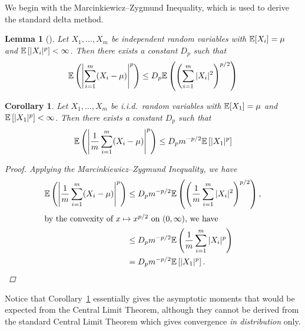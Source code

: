 \documentclass[a4paper, 10pt]{report}
\theoremstyle{plain}
\newtheorem{lemma}[theorem]{Lemma}
\newtheorem{corollary}[theorem]{Corollary}
\begin{document}
	
	We begin with the Marcinkiewicz--Zygmund Inequality, which is used to derive the standard delta method.
	\begin{lemma}[\citet{marcinkiewicz1937quelques}]
		Let $X_1,\dots,X_m$ be independent random variables with $\mathbb{E}[X_i]=\mu$ and $\mathbb{E}\left[|X_i|^p\right]<\infty$. 
		Then there exists a constant $D_p$ such that
		\begin{equation}
		\mathbb{E}\left( \left|\sum_{i=1}^m (X_i - \mu) \right|^p \right) \le D_p \mathbb{E}\left( \left( \sum_{i=1}^m |X_i|^2 \right)^{p/2} \right)
		\end{equation}
	\end{lemma}
	\begin{corollary}
		\label{cor:moment}
		Let $X_1,\dots,X_m$ be i.i.d.~random variables with $\mathbb{E}[X_1]=\mu$ and $\mathbb{E}\left[|X_1|^p\right]<\infty$. 
		Then there exists a constant $D_p$ such that
		\begin{equation}
		\mathbb{E}\left( \left| \frac{1}{m} \sum_{i=1}^m (X_i - \mu) \right|^p \right) \le D_p m^{-p/2} \mathbb{E}\left[|X_1|^p  \right]
		\end{equation}
		\begin{proof}
			Applying the Marcinkiewicz--Zygmund Inequality, we have
			\begin{align}
			\mathbb{E}\left( \left| \frac{1}{m} \sum_{i=1}^m (X_i - \mu) \right|^p \right) & \le D_p m^{-p/2} \mathbb{E}\left( \left( \frac{1}{m} \sum_{i=1}^m |X_i|^2 \right)^{p/2} \right), \\
			\intertext{by the convexity of $x \mapsto x^{p/2}$ on $(0,\infty)$, we have}
			& \le D_p m^{-p/2} \mathbb{E}\left(  \frac{1}{m} \sum_{i=1}^m |X_i|^p  \right)\\
			&= D_p m^{-p/2} \mathbb{E}\left[|X_1|^p  \right].
			\end{align}
		\end{proof}
	\end{corollary}
	Notice that Corollary~\ref{cor:moment} essentially gives the asymptotic moments that would be expected from the Central Limit Theorem, although they cannot be derived from the standard Central Limit Theorem which gives convergence \emph{in distribution} only.
\end{document}
